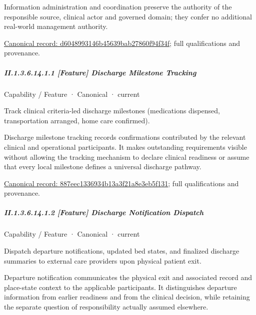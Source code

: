 Information administration and coordination preserve the authority of the responsible source, clinical actor and governed domain; they confer no additional real-world management authority.


{\footnotesize \href{../../../../../../../continuum/strategy/capability/d6048993146b45639bab27860f94f34f.md}{Canonical record: d6048993146b45639bab27860f94f34f}; full qualifications and provenance.}\par
\subparagraph*{II.1.3.6.14.1.1 [Feature] Discharge Milestone Tracking}
\label{navigation:II.1.3.6.14.1.1}

\label{element:887eec1336934b13a3f21a8e3eb5f131}
{\small Capability / Feature · Canonical · current}\par

Track clinical criteria-led discharge milestones (medications dispensed, transportation arranged, home care confirmed).



Discharge milestone tracking records confirmations contributed by the relevant clinical and operational participants. It makes outstanding requirements visible without allowing the tracking mechanism to declare clinical readiness or assume that every local milestone defines a universal discharge pathway.


{\footnotesize \href{../../../../../../../continuum/strategy/capability/feature/887eec1336934b13a3f21a8e3eb5f131.md}{Canonical record: 887eec1336934b13a3f21a8e3eb5f131}; full qualifications and provenance.}\par
\subparagraph*{II.1.3.6.14.1.2 [Feature] Discharge Notification Dispatch}
\label{navigation:II.1.3.6.14.1.2}

\label{element:5476307ca5a34590aa7025ab59ca0c10}
{\small Capability / Feature · Canonical · current}\par

Dispatch departure notifications, updated bed states, and finalized discharge summaries to external care providers upon physical patient exit.



Departure notification communicates the physical exit and associated record and place-state context to the applicable participants. It distinguishes departure information from earlier readiness and from the clinical decision, while retaining the separate question of responsibility actually assumed elsewhere.


